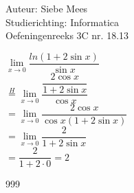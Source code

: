 \documentclass[a4paper]{article}
\begin{document}
  
\noindent \large Auteur: Siebe Mees \\
\noindent \large Studierichting: Informatica\\
\noindent \large Oefeningenreeks 3C nr. 18.13\\

\medskip

\normalsize

$\lim\limits_{x \rightarrow 0} \dfrac{ln(1+2\sin x)}{\sin x}$\\

$\overset{H}{=}  \lim\limits_{x \rightarrow 0} \dfrac{\dfrac{2 \cos x}{1+2 \sin x}}{\cos x} $\\

$ = \lim\limits_{x \rightarrow 0} \dfrac{2 \cos x}{\cos x (1+2\sin x)} $\\

$ = \lim\limits_{x \rightarrow 0} \dfrac{2}{1+2\sin x} $\\

$ = \dfrac{2}{1+2\cdot 0} = 2 $\\

\begin{thebibliography}{999}
\end{thebibliography}
\end{document}
